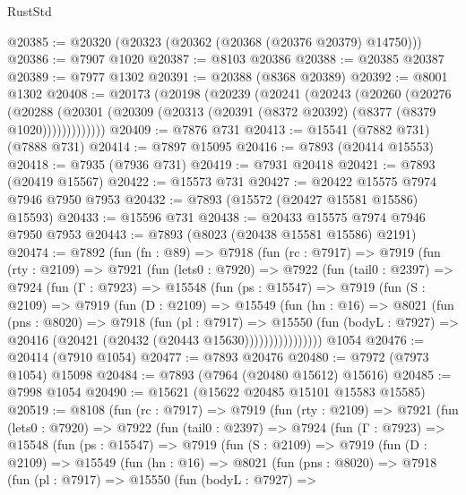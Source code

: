 \begin{lexlean}{RustStd}
\begin{coremodule}
@20385 := @20320 (@20323 (@20362 (@20368 (@20376 @20379) @14750)))
@20386 := @7907 @1020
@20387 := @8103 @20386
@20388 := @20385 @20387
@20389 := @7977 @1302
@20391 := @20388 (@8368 @20389)
@20392 := @8001 @1302
@20408 := @20173
    (@20198
      (@20239
        (@20241
          (@20243
            (@20260
              (@20276
                (@20288
                  (@20301 (@20309 (@20313 (@20391 (@8372 @20392) (@8377 (@8379 @1020)))))))))))))
@20409 := @7876 @731
@20413 := @15541 (@7882 @731) (@7888 @731)
@20414 := @7897 @15095
@20416 := @7893 (@20414 @15553)
@20418 := @7935 (@7936 @731)
@20419 := @7931 @20418
@20421 := @7893 (@20419 @15567)
@20422 := @15573 @731
@20427 := @20422 @15575 @7974 @7946 @7950 @7953
@20432 := @7893 (@15572 (@20427 @15581 @15586) @15593)
@20433 := @15596 @731
@20438 := @20433 @15575 @7974 @7946 @7950 @7953
@20443 := @7893 (@8023 (@20438 @15581 @15586) @2191)
@20474 := @7892
    (fun (fn : @89) =>
    @7918
      (fun (rc : @7917) =>
      @7919
        (fun (rty : @2109) =>
        @7921
          (fun (lets0 : @7920) =>
          @7922
            (fun (tail0 : @2397) =>
            @7924
              (fun (Γ : @7923) =>
              @15548
                (fun (ps : @15547) =>
                @7919
                  (fun (S : @2109) =>
                  @7919
                    (fun (D : @2109) =>
                    @15549
                      (fun (hn : @16) =>
                      @8021
                        (fun (pns : @8020) =>
                        @7918
                          (fun (pl : @7917) =>
                          @15550
                            (fun (bodyL : @7927) =>
                            @20416 (@20421 (@20432 (@20443 @15630))))))))))))))))
    @1054
@20476 := @20414 (@7910 @1054)
@20477 := @7893 @20476
@20480 := @7972 (@7973 @1054) @15098
@20484 := @7893 (@7964 (@20480 @15612) @15616)
@20485 := @7998 @1054
@20490 := @15621 (@15622 @20485 @15101 @15583 @15585)
@20519 := @8108
    (fun (rc : @7917) =>
    @7919
      (fun (rty : @2109) =>
      @7921
        (fun (lets0 : @7920) =>
        @7922
          (fun (tail0 : @2397) =>
          @7924
            (fun (Γ : @7923) =>
            @15548
              (fun (ps : @15547) =>
              @7919
                (fun (S : @2109) =>
                @7919
                  (fun (D : @2109) =>
                  @15549
                    (fun (hn : @16) =>
                    @8021
                      (fun (pns : @8020) =>
                      @7918
                        (fun (pl : @7917) =>
                        @15550
                          (fun (bodyL : @7927) =>

\end{coremodule}
\end{lexlean}
